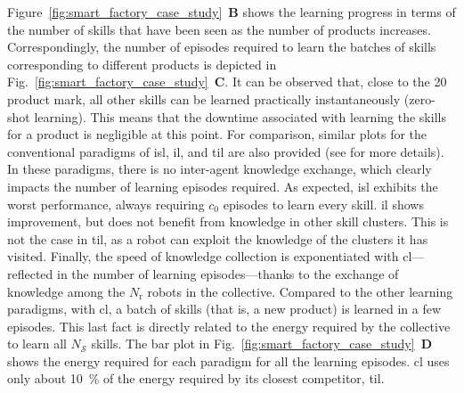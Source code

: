 \documentclass[12pt]{article}
\begin{document}
Figure~\ref{fig:smart_factory_case_study}~\textbf{B} shows the learning progress in terms of the number of skills that have been seen as the number of products increases. Correspondingly, the number of episodes required to learn the batches of skills corresponding to different products is depicted in Fig.~\ref{fig:smart_factory_case_study}~\textbf{C}. It can be observed that, close to the 20 product mark, all other skills can be learned practically instantaneously (zero-shot learning). This means that the downtime associated with learning the skills for a product is negligible at this point. For comparison, similar plots for the conventional paradigms of \ac{isl}, \ac{il}, and \ac{til} are also provided (see  for more details). In these paradigms, there is no inter-agent knowledge exchange, which clearly impacts the number of learning episodes required. As expected, \ac{isl} exhibits the worst performance, always requiring $c_0$ episodes to learn every skill. \ac{il} shows improvement, but does not benefit from knowledge in other skill clusters. This is not the case in \ac{til}, as a robot can exploit the knowledge of the clusters it has visited. Finally, the speed of knowledge collection is exponentiated with \ac{cl}---reflected in the number of learning episodes---thanks to the exchange of knowledge among the $N_\mathrm{r}$ robots in the collective. Compared to the other learning paradigms, with \ac{cl}, a batch of skills (that is, a new product) is learned in a few episodes. This last fact is directly related to the energy required by the collective to learn all $N_\mathcal{S}$ skills. The bar plot in Fig.~\ref{fig:smart_factory_case_study}~\textbf{D} shows the energy required for each paradigm for all the learning episodes. \Acl{cl} uses only about 10~\% of the energy required by its closest competitor, \acl{til}.

\end{document}
